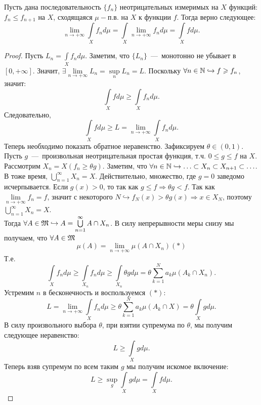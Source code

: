 \hypertarget{beppo_levi}{}
\begin{theorem}
    Пусть дана последовательность $\{f_n\}$ неотрицательных измеримых на $X$ функций: $f_n \leq f_{n + 1}$ на $X$, сходящаяся $\mu-$п.в. на $X$ к функции $f$. Тогда верно следующее: \[\lim\limits_{n \rightarrow +\infty} \int\limits_X f_nd\mu = \int\limits_X \lim\limits_{n \rightarrow +\infty} f_n d\mu = \int\limits_X fd\mu.\]
\end{theorem}
\begin{proof}
    Пусть $L_n = \int\limits_X f_nd\mu$. Заметим, что $\{L_n\}$~---~монотонно не убывает в $[0, +\infty]$. Значит, $\exists \lim\limits_{n\rightarrow+\infty} L_n = \sup\limits_n L_n = L$. Поскольку $\forall n \in \mathbb{N} \hookrightarrow f \geqslant f_n$, значит: \[\int\limits_X fd\mu \geq \int\limits_X f_nd\mu.\]
    Следовательно, \[\int\limits_X fd\mu \geq L = \lim\limits_{n \rightarrow +\infty} \int\limits_X f_nd\mu.\]
    Теперь необходимо показать обратное неравенство. Зафиксируем $\theta \in (0, 1)$. Пусть $g$~---~произвольная неотрицательная простая функция, т.ч. $0 \leq g \leq f$ на $X$.\\ Рассмотрим $X_n = X(f_n \geq \theta g)$. Заметим, что $ \forall n \in \mathbb{N} \hookrightarrow \ldots \subset X_n \subset X_{n + 1} \subset \ldots$. В тоже время, $\bigcup\limits_{n = 1}^\infty X_n = X$. Действительно, множество, где $g = 0$ заведомо исчерпывается. Если $g(x) > 0$, то так как $g \leq f \Rightarrow \theta g < f$. Так как $\lim\limits_{n\rightarrow +\infty}f_n = f$, значит с некоторого $N \hookrightarrow f_N(x) > \theta g(x) \Rightarrow x \in X_N$, поэтому $\bigcup\limits_{n = 1}^\infty X_n = X$. \\
    Тогда $\forall A \in \mathfrak{M} \hookrightarrow A = \bigcup\limits_{n = 1}^\infty A \cap X_n$. В силу непрерывности меры снизу мы получаем, что $\forall A \in \mathfrak{M}$ \[\mu(A) = \lim\limits_{n \rightarrow +\infty} \mu(A \cap X_n) (*)\]
    Т.е. \[\int\limits_X f_nd\mu \geq \int\limits_{X_n} f_nd\mu \geq \int\limits_{X_n} \theta g d\mu = \theta \sum\limits_{k = 1}^N a_k\mu(A_k \cap X_n).\]
    Устремим $n$ в бесконечность и воспользуемся $(*)$:
    \[L = \lim\limits_{n \rightarrow +\infty} \int\limits_X f_nd\mu \geq \theta\sum\limits_{k = 1}^N a_k\mu(A_k \cap X) = \theta\int\limits_{X} gd\mu.\]
    В силу произвольного выбора $\theta$, при взятии супремума по $\theta$, мы получим следующее неравенство: \[L \geq \int\limits_X gd\mu.\]
    Теперь взяв супремум по всем таким $g$ мы получим искомое включение: \[L \geq \sup\limits_g \int\limits_X gd\mu = \int\limits_X fd\mu.\]
\end{proof} 


